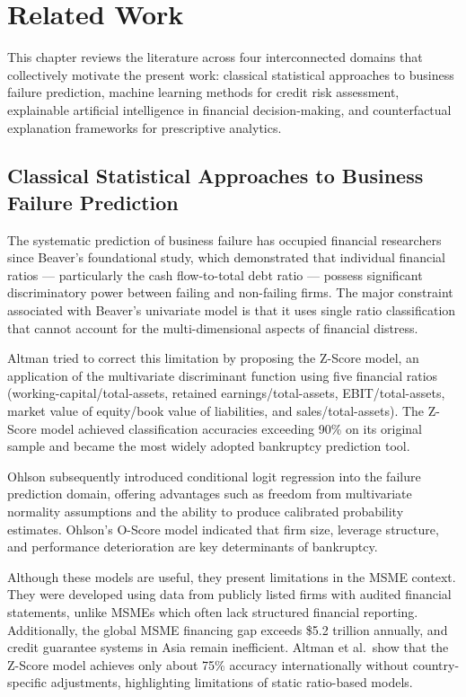 \documentclass[12pt,a4paper]{report}
\begin{document}
\chapter{Related Work}

This chapter reviews the literature across four interconnected domains that collectively motivate the present work: classical statistical approaches to business failure prediction, machine learning methods for credit risk assessment, explainable artificial intelligence in financial decision-making, and counterfactual explanation frameworks for prescriptive analytics.

\section{Classical Statistical Approaches to Business Failure Prediction}

The systematic prediction of business failure has occupied financial researchers since Beaver's foundational study, which demonstrated that individual financial ratios --- particularly the cash flow-to-total debt ratio --- possess significant discriminatory power between failing and non-failing firms. The major constraint associated with Beaver's univariate model is that it uses single ratio classification that cannot account for the multi-dimensional aspects of financial distress.

Altman tried to correct this limitation by proposing the Z-Score model, an application of the multivariate discriminant function using five financial ratios (working-capital/total-assets, retained earnings/total-assets, EBIT/total-assets, market value of equity/book value of liabilities, and sales/total-assets). The Z-Score model achieved classification accuracies exceeding 90\% on its original sample and became the most widely adopted bankruptcy prediction tool.

Ohlson subsequently introduced conditional logit regression into the failure prediction domain, offering advantages such as freedom from multivariate normality assumptions and the ability to produce calibrated probability estimates. Ohlson's O-Score model indicated that firm size, leverage structure, and performance deterioration are key determinants of bankruptcy.

Although these models are useful, they present limitations in the MSME context. They were developed using data from publicly listed firms with audited financial statements, unlike MSMEs which often lack structured financial reporting. Additionally, the global MSME financing gap exceeds \$5.2 trillion annually, and credit guarantee systems in Asia remain inefficient. Altman et al.\ show that the Z-Score model achieves only about 75\% accuracy internationally without country-specific adjustments, highlighting limitations of static ratio-based models.
\end{document}
